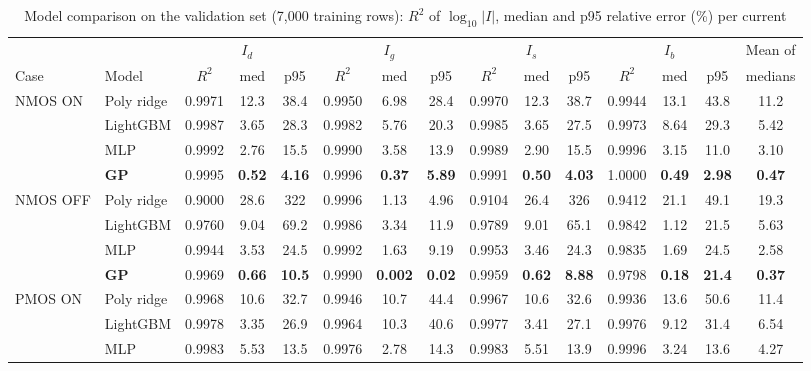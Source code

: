 ﻿\documentclass[conference,10pt]{IEEEtran}
\begin{document}
\begin{table}[!t]
\caption{Model comparison on the validation set (7,000 training rows): $R^2$ of $\log_{10}|I|$, median and p95 relative error (\%) per current}
\label{tab:modelcmp}
\centering
\footnotesize
\begin{tabular}{@{}ll ccc ccc ccc ccc c@{}}
\toprule
 & & \multicolumn{3}{c}{$I_d$} & \multicolumn{3}{c}{$I_g$} & \multicolumn{3}{c}{$I_s$} & \multicolumn{3}{c}{$I_b$} & Mean of\\
\cmidrule(lr){3-5}\cmidrule(lr){6-8}\cmidrule(lr){9-11}\cmidrule(lr){12-14}
Case & Model & $R^2$ & med & p95 & $R^2$ & med & p95 & $R^2$ & med & p95 & $R^2$ & med & p95 & medians\\
\midrule
NMOS ON & Poly ridge & 0.9971 & 12.3 & 38.4 & 0.9950 & 6.98 & 28.4 & 0.9970 & 12.3 & 38.7 & 0.9944 & 13.1 & 43.8 & 11.2\\
 & LightGBM & 0.9987 & 3.65 & 28.3 & 0.9982 & 5.76 & 20.3 & 0.9985 & 3.65 & 27.5 & 0.9973 & 8.64 & 29.3 & 5.42\\
 & MLP & 0.9992 & 2.76 & 15.5 & 0.9990 & 3.58 & 13.9 & 0.9989 & 2.90 & 15.5 & 0.9996 & 3.15 & 11.0 & 3.10\\
 & \textbf{GP} & 0.9995 & \textbf{0.52} & \textbf{4.16} & 0.9996 & \textbf{0.37} & \textbf{5.89} & 0.9991 & \textbf{0.50} & \textbf{4.03} & 1.0000 & \textbf{0.49} & \textbf{2.98} & \textbf{0.47}\\
\midrule
NMOS OFF & Poly ridge & 0.9000 & 28.6 & 322 & 0.9996 & 1.13 & 4.96 & 0.9104 & 26.4 & 326 & 0.9412 & 21.1 & 49.1 & 19.3\\
 & LightGBM & 0.9760 & 9.04 & 69.2 & 0.9986 & 3.34 & 11.9 & 0.9789 & 9.01 & 65.1 & 0.9842 & 1.12 & 21.5 & 5.63\\
 & MLP & 0.9944 & 3.53 & 24.5 & 0.9992 & 1.63 & 9.19 & 0.9953 & 3.46 & 24.3 & 0.9835 & 1.69 & 24.5 & 2.58\\
 & \textbf{GP} & 0.9969 & \textbf{0.66} & \textbf{10.5} & 0.9990 & \textbf{0.002} & \textbf{0.02} & 0.9959 & \textbf{0.62} & \textbf{8.88} & 0.9798 & \textbf{0.18} & \textbf{21.4} & \textbf{0.37}\\
\midrule
PMOS ON & Poly ridge & 0.9968 & 10.6 & 32.7 & 0.9946 & 10.7 & 44.4 & 0.9967 & 10.6 & 32.6 & 0.9936 & 13.6 & 50.6 & 11.4\\
 & LightGBM & 0.9978 & 3.35 & 26.9 & 0.9964 & 10.3 & 40.6 & 0.9977 & 3.41 & 27.1 & 0.9976 & 9.12 & 31.4 & 6.54\\
 & MLP & 0.9983 & 5.53 & 13.5 & 0.9976 & 2.78 & 14.3 & 0.9983 & 5.51 & 13.9 & 0.9996 & 3.24 & 13.6 & 4.27\\

\end{tabular}
\end{table}
\end{document}
